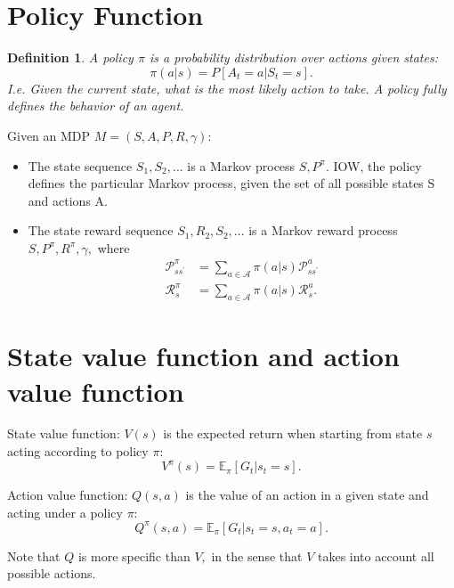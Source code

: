 \documentclass[20pt]{extarticle}
\theoremstyle{plain}
\newtheorem{definition}[theorem]{Definition}
\theoremstyle{definition}
\theoremstyle{remark}
\newcommand{\0}{\varnothing}
\newcommand{\<}{\langle}
\renewcommand{\>}{\rangle}
\begin{document}
\section{Policy Function}

\begin{definition}
  A policy \( \pi \) is a probability distribution over actions given states:
\[
  \pi(a|s) = P[A_t = a | S_t = s].
\]
I.e. Given the current state, what is the most likely action to take. A policy fully defines the behavior of an agent.
\end{definition}



Given an MDP \( M = (S, A, P, R, \gamma): \)

\begin{itemize}
\item The state sequence \( S_1, S_2, \ldots \) is a Markov process \( S, P^\pi. \) IOW, the policy defines the particular Markov process, given the set of all possible states S and actions A.

\item The state reward sequence \( S_1, R_2, S_2, \ldots \) is a Markov reward process \( S, P^\pi, R^\pi, \gamma, \)
where
\begin{align*}
\mathcal { P } _ { s s ^ { \prime } } ^ { \pi } &= \sum _ { a \in \mathcal { A } } \pi ( a | s ) \mathcal { P } _ { s s ^ { \prime } } ^ { a } \\
\mathcal { R } _ { s } ^ { \pi } &= \sum _ { a \in \mathcal { A } } \pi ( a | s ) \mathcal { R } _ { s } ^ { a }.
\end{align*}
\end{itemize}

\section{State value function and action value function}


State value function: \( V(s) \) is the expected return when starting from state \( s \) acting according to policy \( \pi: \)
\[
V ^ { \pi } ( s ) = \mathbb { E } _ { \pi } \left[ G _ { t } | s _ { t } = s \right].
\]

Action value function: \( Q(s, a) \) is the value of an action in a given state and acting under a policy \( \pi: \)
\[
Q ^ { \pi } ( s , a ) = \mathbb { E } _ { \pi } \left[ G _ { t } | s _ { t } = s , a _ { t } = a \right].
\]

Note that \( Q \) is more specific than \( V, \) in the sense that \( V \) takes into account all possible actions.
\end{document}
